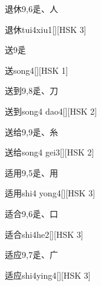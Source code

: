 \begin{entry}{退休}{9,6}{⾡、⼈}
  \begin{phonetics}{退休}{tui4xiu1}[][HSK 3]
  \end{phonetics}
\end{entry}

\begin{entry}{送}{9}{⾡}
  \begin{phonetics}{送}{song4}[][HSK 1]
  \end{phonetics}
\end{entry}

\begin{entry}{送到}{9,8}{⾡、⼑}
  \begin{phonetics}{送到}{song4 dao4}[][HSK 2]
  \end{phonetics}
\end{entry}

\begin{entry}{送给}{9,9}{⾡、⽷}
  \begin{phonetics}{送给}{song4 gei3}[][HSK 2]
  \end{phonetics}
\end{entry}

\begin{entry}{适用}{9,5}{⾡、⽤}
  \begin{phonetics}{适用}{shi4 yong4}[][HSK 3]
  \end{phonetics}
\end{entry}

\begin{entry}{适合}{9,6}{⾡、⼝}
  \begin{phonetics}{适合}{shi4he2}[][HSK 3]
  \end{phonetics}
\end{entry}

\begin{entry}{适应}{9,7}{⾡、⼴}
  \begin{phonetics}{适应}{shi4ying4}[][HSK 3]
  \end{phonetics}
\end{entry}

